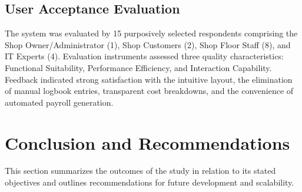 \documentclass[12pt, letterpaper]{article}
\begin{document}
\subsection{User Acceptance Evaluation}
\hspace*{2em} The system was evaluated by 15 purposively selected respondents comprising the Shop Owner/Administrator (1), Shop Customers (2), Shop Floor Staff (8), and IT Experts (4). Evaluation instruments assessed three quality characteristics: Functional Suitability, Performance Efficiency, and Interaction Capability. Feedback indicated strong satisfaction with the intuitive layout, the elimination of manual logbook entries, transparent cost breakdowns, and the convenience of automated payroll generation.


\section{Conclusion and Recommendations}
\hspace*{2em} This section summarizes the outcomes of the study in relation to its stated objectives and outlines recommendations for future development and scalability.
\end{document}
